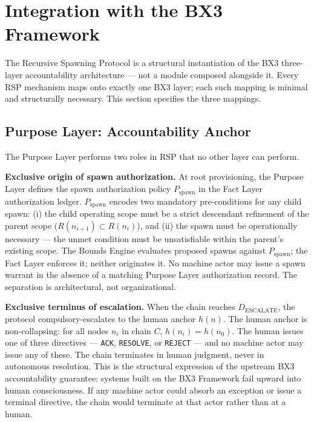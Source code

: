 \section{Integration with the BX3 Framework}
\label{sec:rs-integration}

The Recursive Spawning Protocol is a structural instantiation of the BX3 three-layer accountability architecture — not a module composed alongside it. Every RSP mechanism maps onto exactly one BX3 layer; each such mapping is minimal and structurally necessary. This section specifies the three mappings.

\subsection{Purpose Layer: Accountability Anchor}
\label{sec:rs-purpose-anchor}

The Purpose Layer performs two roles in RSP that no other layer can perform.

\medskip
\noindent\textbf{Exclusive origin of spawn authorization.} At root provisioning, the Purpose Layer defines the spawn authorization policy $P_{\mathrm{spawn}}$ in the Fact Layer authorization ledger. $P_{\mathrm{spawn}}$ encodes two mandatory pre-conditions for any child spawn: (i) the child operating scope must be a strict descendant refinement of the parent scope ($R(n_{i+1}) \subset R(n_i)$), and (ii) the spawn must be operationally necessary — the unmet condition must be unsatisfiable within the parent's existing scope. The Bounds Engine evaluates proposed spawns against $P_{\mathrm{spawn}}$; the Fact Layer enforces it; neither originates it. No machine actor may issue a spawn warrant in the absence of a matching Purpose Layer authorization record. The separation is architectural, not organizational.

\medskip
\noindent\textbf{Exclusive terminus of escalation.} When the chain reaches $D_{\mathrm{ESCALATE}}$, the protocol compulsory-escalates to the human anchor $h(n)$. The human anchor is non-collapsing: for all nodes $n_i$ in chain $C$, $h(n_i) = h(n_0)$. The human issues one of three directives — \texttt{ACK}, \texttt{RESOLVE}, or \texttt{REJECT} — and no machine actor may issue any of these. The chain terminates in human judgment, never in autonomous resolution. This is the structural expression of the upstream BX3 accountability guarantee: systems built on the BX3 Framework fail upward into human consciousness. If any machine actor could absorb an exception or issue a terminal directive, the chain would terminate at that actor rather than at a human.


